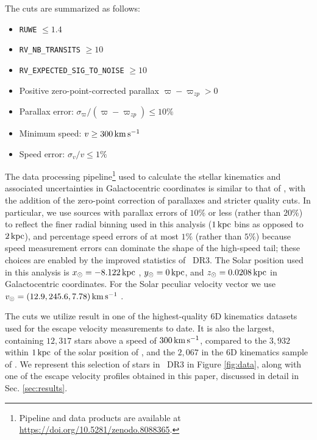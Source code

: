 The cuts are summarized as follows:
\begin{itemize}[itemsep=0em, label=-]
    \item \texttt{RUWE} $\leq 1.4$
    \item \texttt{RV\_NB\_TRANSITS} $\geq10$   
    \item \texttt{RV\_EXPECTED\_SIG\_TO\_NOISE} $\geq10$   
    \item Positive zero-point-corrected parallax $\varpi - \varpi_{zp} > 0$
    \item Parallax error: $\sigma_{\varpi}/(\varpi - \varpi_{zp}) \leq 10\%$
    \item Minimum speed: $v\geq 300\,\rm{km\,s^{-1}}$ 
    \item Speed error: $\sigma_v/v \leq 1\%$
\end{itemize}

The data processing pipeline\footnote{Pipeline and data products are available at \url{https://doi.org/10.5281/zenodo.8088365}.} used to calculate the stellar kinematics and associated uncertainties in Galactocentric coordinates is similar to that of \cite{Necib2022}, with the addition of the zero-point correction of parallaxes and stricter quality cuts. In particular, we use sources with parallax errors of $10\%$ or less (rather than $20\%$) to reflect the finer radial binning used in this analysis ($1\,\rm{kpc}$ bins as opposed to $2\,\rm{kpc}$), and percentage speed errors of at most $1\%$ (rather than $5\%$) because speed measurement errors can dominate the shape of the high-speed tail; these choices are enabled by the improved statistics of \Gaia~DR3. The Solar position used in this analysis is $x_\odot = -8.122\,\rm{kpc}$ \citep{gravity:2018}, $y_\odot = 0\,\rm{kpc}$, and $z_\odot=0.0208\,\rm{kpc}$ \citep{Bennett:2018} in Galactocentric coordinates. For the Solar peculiar velocity vector we use $v_\odot = (12.9, 245.6, 7.78)\,\rm{km\,s^{-1}}$ \citep{Drimmel:2018}. 

The cuts we utilize result in one of the highest-quality 6D kinematics datasets used for the escape velocity measurements to date. It is also the largest, containing $12,317$ stars above a speed of $300\,\rm{km\,s^{-1}}$, compared to the $3,932$ within $1\,\rm{kpc}$ of the solar position of \cite{Necib2022}, and the $2,067$ in the 6D kinematics sample of \cite{Koppelman2021}. We represent this selection of stars in \Gaia~DR3 in Figure \ref{fig:data}, along with one of the escape velocity profiles obtained in this paper, discussed in detail in Sec. \ref{sec:results}. 

